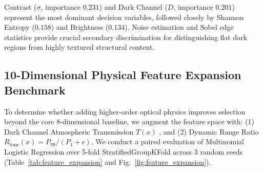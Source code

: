 \documentclass[journal]{IEEEtran}
\begin{document}
Contrast ($\sigma$, importance $0.231$) and Dark Channel ($D$, importance $0.201$) represent the most dominant decision variables, followed closely by Shannon Entropy ($0.158$) and Brightness ($0.134$). Noise estimation and Sobel edge statistics provide crucial secondary discrimination for distinguishing flat dark regions from highly textured structural content.

\subsection{10-Dimensional Physical Feature Expansion Benchmark}
To determine whether adding higher-order optical physics improves selection beyond the core 8-dimensional baseline, we augment the feature space with: (1) Dark Channel Atmospheric Transmission $T(x)$ \cite{he2011single}, and (2) Dynamic Range Ratio $R_{\text{tone}}(x) = P_{99} / (P_1 + \epsilon)$. We conduct a paired evaluation of Multinomial Logistic Regression over 5-fold StratifiedGroupKFold across 3 random seeds (Table~\ref{tab:feature_expansion} and Fig.~\ref{fig:feature_expansion}).

\begin{table}[!t]
\centering
\caption{8D Baseline vs. 10D Physical Feature Expansion (5-Fold Grouped CV across 3 Seeds)}
\label{tab:feature_expansion}
\end{table}
\end{document}
